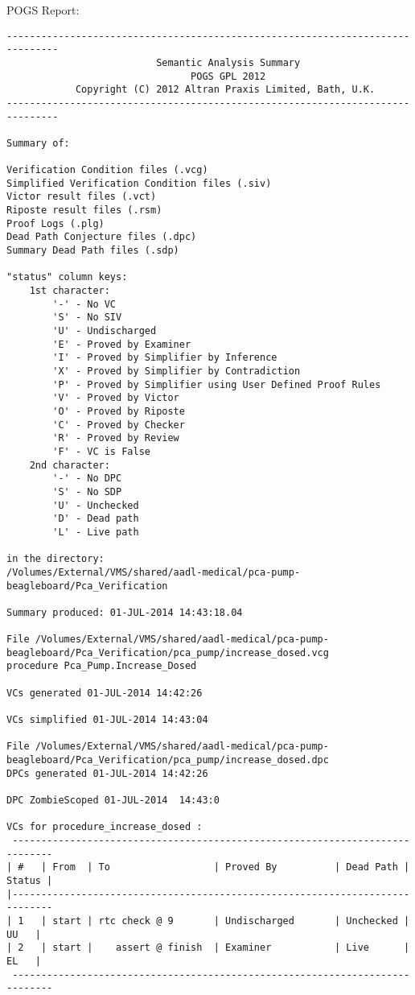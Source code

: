 POGS Report:

\begin{lstlisting}
-------------------------------------------------------------------------------
                          Semantic Analysis Summary                            
                                POGS GPL 2012                                  
            Copyright (C) 2012 Altran Praxis Limited, Bath, U.K.               
-------------------------------------------------------------------------------

Summary of:

Verification Condition files (.vcg)
Simplified Verification Condition files (.siv)
Victor result files (.vct)
Riposte result files (.rsm)
Proof Logs (.plg)
Dead Path Conjecture files (.dpc)
Summary Dead Path files (.sdp)

"status" column keys:
    1st character:
        '-' - No VC
        'S' - No SIV
        'U' - Undischarged
        'E' - Proved by Examiner
        'I' - Proved by Simplifier by Inference
        'X' - Proved by Simplifier by Contradiction
        'P' - Proved by Simplifier using User Defined Proof Rules
        'V' - Proved by Victor
        'O' - Proved by Riposte
        'C' - Proved by Checker
        'R' - Proved by Review
        'F' - VC is False
    2nd character:
        '-' - No DPC
        'S' - No SDP
        'U' - Unchecked
        'D' - Dead path
        'L' - Live path

in the directory:
/Volumes/External/VMS/shared/aadl-medical/pca-pump-beagleboard/Pca_Verification

Summary produced: 01-JUL-2014 14:43:18.04

File /Volumes/External/VMS/shared/aadl-medical/pca-pump-beagleboard/Pca_Verification/pca_pump/increase_dosed.vcg
procedure Pca_Pump.Increase_Dosed

VCs generated 01-JUL-2014 14:42:26

VCs simplified 01-JUL-2014 14:43:04

File /Volumes/External/VMS/shared/aadl-medical/pca-pump-beagleboard/Pca_Verification/pca_pump/increase_dosed.dpc
DPCs generated 01-JUL-2014 14:42:26

DPC ZombieScoped 01-JUL-2014  14:43:0

VCs for procedure_increase_dosed :
 -----------------------------------------------------------------------------
| #   | From  | To                  | Proved By          | Dead Path | Status |
|-----------------------------------------------------------------------------
| 1   | start | rtc check @ 9       | Undischarged       | Unchecked |   UU   |
| 2   | start |    assert @ finish  | Examiner           | Live      |   EL   |
 -----------------------------------------------------------------------------



\end{lstlisting}
